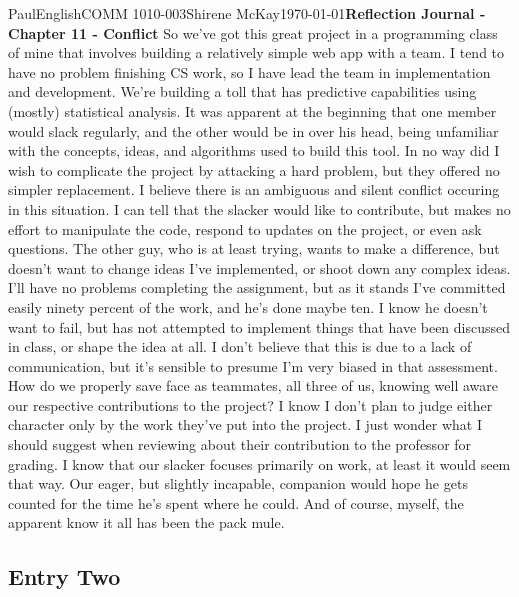 \documentclass[12pt,letterpaper]{article}
\begin{document}
\begin{mla}{Paul}{English}{COMM 1010-003}{Shirene
    McKay}{\today}{\textbf{Reflection Journal - Chapter 11 - Conflict}}
So we've got this great project in a programming class of mine that involves building a relatively simple web app with a team. I tend to have no problem finishing CS work, so I have lead the team in implementation and development. We're building a toll that has predictive capabilities using (mostly) statistical analysis. It was apparent at the beginning that one member would slack regularly, and the other would be in over his head, being unfamiliar with the concepts, ideas, and algorithms used to build this tool. In no way did I wish to complicate the project by attacking a hard problem, but they offered no simpler replacement. I believe there is an ambiguous and silent conflict occuring in this situation. I can tell that the slacker would like to contribute, but makes no effort to manipulate the code, respond to updates on the project, or even ask questions. The other guy, who is at least trying, wants to make a difference, but doesn't want to change ideas I've implemented, or shoot down any complex ideas. I'll have no problems completing the assignment, but as it stands I've committed easily ninety percent of the work, and he's done maybe ten. I know he doesn't want to fail, but has not attempted to implement things that have been discussed in class, or shape the idea at all. I don't believe that this is due to a lack of communication, but it's sensible to presume I'm very biased in that assessment. How do we properly save face as teammates, all three of us, knowing well aware our respective contributions to the project? I know I don't plan to judge either character only by the work they've put into the project. I just wonder what I should suggest when reviewing about their contribution to the professor for grading. I know that our slacker focuses primarily on work, at least it would seem that way. Our eager, but slightly incapable, companion would hope he gets counted for the time he's spent where he could. And of course, myself, the apparent know it all has been the pack mule.

\subsection{Entry Two}


\end{mla}
\end{document}
